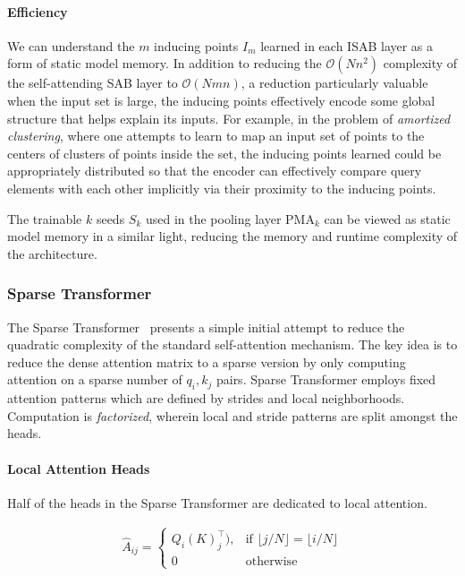 \paragraph{Efficiency}
We can understand the $m$ inducing points $I_m$ learned in each ISAB layer as a form of static model memory. In addition to reducing the $\mathcal{O}(N n^2)$ complexity of the self-attending SAB layer to $\mathcal{O}(N m n)$, a reduction particularly valuable when the input set is large, the inducing points effectively encode some global structure that helps explain its inputs. For example, in the problem of \emph{amortized clustering}, where one attempts to learn to map an input set of points to the centers of clusters of points inside the set, the inducing points learned could be appropriately distributed so that the encoder can effectively compare query elements with each other implicitly via their proximity to the inducing points.

The trainable $k$ seeds $S_k$ used in the pooling layer $\text{PMA}_k$ can be viewed as static model memory in a similar light, reducing the memory and runtime complexity of the architecture. 

\subsubsection{Sparse Transformer} The Sparse Transformer~\citep{child2019generating} presents a simple initial attempt to reduce the quadratic complexity of the standard self-attention mechanism. The key idea is to reduce the dense attention matrix to a sparse version by only computing attention on a sparse number of $q_i,k_j$ pairs. Sparse Transformer employs fixed attention patterns which are defined by strides and local neighborhoods. Computation is \textit{factorized}, wherein local and stride patterns are split amongst the heads. 
\paragraph{Local Attention Heads} Half of the heads in the Sparse Transformer are dedicated to local attention.

\begin{align*}
    \hat{A}_{ij} = 
    \begin{cases}
    Q_{i}(K)_{j}^\top),& \text{if } \lfloor{{j}/{N}}\rfloor = \lfloor{i/{N}}\rfloor\\
    0              & \text{otherwise}
\end{cases}
\end{align*}

